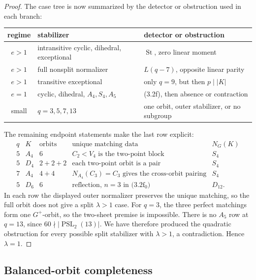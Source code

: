 \documentclass[11pt]{article}
\theoremstyle{definition}
\theoremstyle{remark}
\begin{document}
\begin{proof}
The case tree is now summarized by the detector or obstruction used in
each branch:
\begin{center}
\small
\begin{tabular}{@{}c@{\quad}l@{\quad}l@{}}
\toprule
regime & stabilizer & detector or obstruction\\
\midrule
\(e>1\) & intransitive cyclic, dihedral, exceptional
  & \(\operatorname{St}\), zero linear moment\\
\(e>1\) & full nonsplit normalizer
  & \(L(q-7)\), opposite linear parity\\
\(e>1\) & transitive exceptional
  & only \(q=9\), but then \(p\mid |K|\)\\
\(e=1\) & cyclic, dihedral, \(A_4,S_4,A_5\)
  & (3.2f), then absence or contraction\\
small & \(q=3,5,7,13\)
  & one orbit, outer stabilizer, or no subgroup\\
\bottomrule
\end{tabular}
\end{center}
The remaining endpoint statements make the last row explicit:
\[
\begin{array}{c|c|c|c|c}
q&K&\text{orbits}&\text{unique matching data}&N_G(K)\\ \hline
5&A_4&6&C_2<V_4\text{ is the two-point block}&S_4\\
5&D_4&2+2+2&\text{each two-point orbit is a pair}&S_4\\
7&A_4&4+4&
 N_{A_4}(C_3)=C_3\text{ gives the cross-orbit pairing}&S_4\\
5&D_6&6&\text{reflection, }n=3\text{ in (3.2f$_0$)}&D_{12}.
\end{array}                                               \tag{3.2g$_0$}
\]
In each row the displayed outer normalizer preserves the unique
matching, so the full orbit does not give a split \(\lambda>1\) case.
For \(q=3\), the
three perfect matchings form one \(G^+\)-orbit, so the two-sheet premise
is impossible.  There is no \(A_5\) row at \(q=13\), since
\(60\nmid|\operatorname{PSL}_2(13)|\).  We have therefore produced the
quadratic obstruction for every
possible split stabilizer with \(\lambda>1\), a contradiction.
Hence \(\lambda=1\).
\end{proof}

\subsection{Balanced-orbit completeness}
\end{document}
